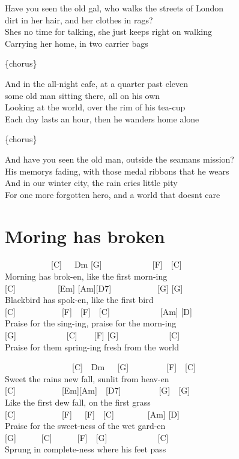 \documentclass[
  letterpaper,
]{scrbook}
\begin{document}
Have you seen the old gal, who walks the streets of London\\
dirt in her hair, and her clothes in rags?\\
She\textquotesingle s no time for talking, she just keeps right on
walking\\
Carrying her home, in two carrier bags

\{chorus\}

And in the all-night cafe, at a quarter past eleven\\
some old man sitting there, all on his own\\
Looking at the world, over the rim of his tea-cup\\
Each day lasts an hour, then he wanders home alone

\{chorus\}

And have you seen the old man, outside the seaman\textquotesingle s
mission?\\
His memory\textquotesingle s fading, with those medal ribbons that he
wears\\
And in our winter city, the rain cries little pity\\
For one more forgotten hero, and a world that doesn\textquotesingle t
care

\hypertarget{moring-has-broken}{%
\chapter{Moring has broken}\label{moring-has-broken}}

~~~~~~~~~~~{[}C{]}~~~Dm {[}G{]}~~~~~~~~~~~~{[}F{]}~~{[}C{]}\\
Morning has brok-en, like the first morn-ing\\
{[}C{]}~~~~~~~~~~{[}Em{]} {[}Am{]}{[}D7{]}~~~~~~~~~~~{[}G{]} {[}G{]}\\
Blackbird has spok-en, like the first bird\\
{[}C{]}~~~~~~~~~~~{[}F{]}~~{[}F{]}~~{[}C{]}~~~~~~~~~~~~{[}Am{]}
{[}D{]}\\
Praise for the sing-ing, praise for the morn-ing\\
{[}G{]}~~~~~~~~~~~~{[}C{]}~~~~{[}F{]} {[}G{]}~~~~~~~~~~~~{[}C{]}\\
Praise for them spring-ing fresh from the world

~~~~~~~~~~~~~~~~{[}C{]}~~Dm~~~{[}G{]}~~~~~~~~~{[}F{]}~~{[}C{]}\\
Sweet the rain\textquotesingle s new fall, sunlit from heav-en\\
{[}C{]}~~~~~~~~~~~{[}Em{]}{[}Am{]}~~{[}D7{]}~~~~~~~~~{[}G{]}~~{[}G{]}\\
Like the first dew fall, on the first grass\\
{[}C{]}~~~~~~~~~~~{[}F{]}~~~{[}F{]}~~{[}C{]}~~~~~~~~{[}Am{]} {[}D{]}\\
Praise for the sweet-ness of the wet gard-en\\
{[}G{]}~~~~~~{[}C{]}~~~~~~{[}F{]}~~{[}G{]}~~~~~~~~~~~~{[}C{]}\\
Sprung in complete-ness where his feet pass
\end{document}
